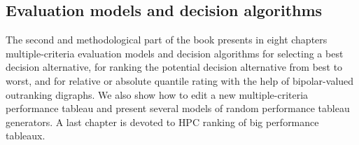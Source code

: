 % 
%
%

\begin{partbacktext}
  \part{Evaluation models and decision algorithms}
\noindent The second and methodological part of the book presents in eight chapters multiple-criteria evaluation models and decision algorithms for selecting a best decision alternative, for ranking the potential decision alternative from best to worst, and for relative or absolute quantile rating with the help of bipolar-valued outranking digraphs. We also show how to edit a new multiple-criteria performance tableau and present several models of random performance tableau generators. A last chapter is devoted to HPC ranking of big performance tableaux.
\end{partbacktext}